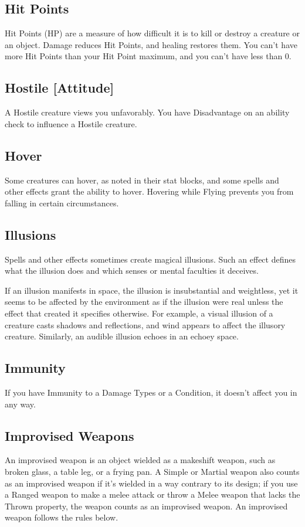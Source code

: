 \documentclass[10pt,a4paper,twoside,bg=print,twocolumn,openany,nodeprecatedcode]{dndarticle}
\begin{document}
\subsection{Hit Points}
Hit Points (HP) are a measure of how difficult it is to kill or destroy a creature or an object. Damage reduces Hit Points, and healing restores them. You can't have more Hit Points than your Hit Point maximum, and you can't have less than 0.

\subsection{Hostile [Attitude]}
A Hostile creature views you unfavorably. You have Disadvantage on an ability check to influence a Hostile creature.

\subsection{Hover}
Some creatures can hover, as noted in their stat blocks, and some spells and other effects grant the ability to hover. Hovering while Flying prevents you from falling in certain circumstances.

\subsection{Illusions}
Spells and other effects sometimes create magical illusions. Such an effect defines what the illusion does and which senses or mental faculties it deceives.

If an illusion manifests in space, the illusion is insubstantial and weightless, yet it seems to be affected by the environment as if the illusion were real unless the effect that created it specifies otherwise. For example, a visual illusion of a creature casts shadows and reflections, and wind appears to affect the illusory creature. Similarly, an audible illusion echoes in an echoey space.

\subsection{Immunity}
If you have Immunity to a Damage Types or a Condition, it doesn't affect you in any way.

\subsection{Improvised Weapons}
An improvised weapon is an object wielded as a makeshift weapon, such as broken glass, a table leg, or a frying pan. A Simple or Martial weapon also counts as an improvised weapon if it's wielded in a way contrary to its design; if you use a Ranged weapon to make a melee attack or throw a Melee weapon that lacks the Thrown property, the weapon counts as an improvised weapon. An improvised weapon follows the rules below.
\end{document}
